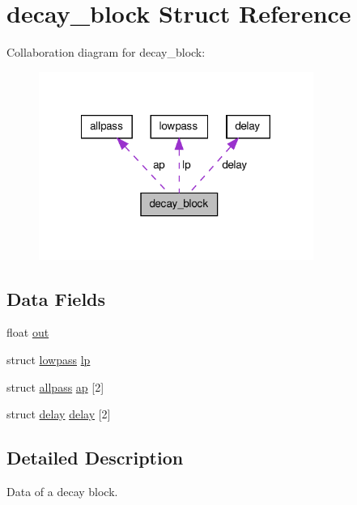 \hypertarget{structdecay__block}{\section{decay\-\_\-block Struct Reference}
\label{structdecay__block}
}


Collaboration diagram for decay\-\_\-block\-:\nopagebreak
\begin{figure}[H]
\begin{center}
\leavevmode
\includegraphics[width=254pt]{structdecay__block__coll__graph}
\end{center}
\end{figure}
\subsection*{Data Fields}
\begin{DoxyCompactItemize}
\item 
float \hyperlink{structdecay__block_ab25f987c34d1ec2d9cf019fc758bc196}{out}
\item 
struct \hyperlink{structlowpass}{lowpass} \hyperlink{structdecay__block_abe3a5f9a9c4bbb4873364861dfd2e1c6}{lp}
\item 
struct \hyperlink{structallpass}{allpass} \hyperlink{structdecay__block_a3f47e2dbc49bfba0a48954341342fea5}{ap} \mbox{[}2\mbox{]}
\item 
struct \hyperlink{structdelay}{delay} \hyperlink{structdecay__block_a954ff93051d7dfe61d76f24270618dc8}{delay} \mbox{[}2\mbox{]}
\end{DoxyCompactItemize}


\subsection{Detailed Description}
Data of a decay block. 

